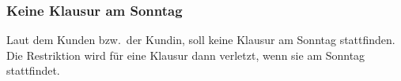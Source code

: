 \subsubsection{Keine Klausur am Sonntag}
Laut dem Kunden bzw.\ der Kundin, soll keine Klausur am Sonntag stattfinden.
Die Restriktion wird für eine Klausur dann verletzt, wenn sie am Sonntag stattfindet.